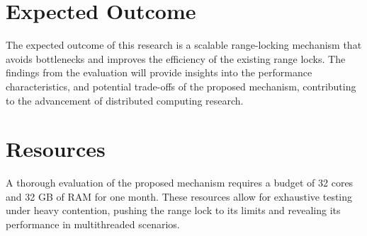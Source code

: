 \section{Expected Outcome}
The expected outcome of this research is a scalable range-locking mechanism that avoids bottlenecks and improves the efficiency of the existing range locks. The findings from the evaluation will provide insights into the performance characteristics, and potential trade-offs of the proposed mechanism, contributing to the advancement of distributed computing research.

\section{Resources}
A thorough evaluation of the proposed mechanism requires a budget of 32 cores and 32 GB of RAM for one month. These resources allow for exhaustive testing under heavy contention, pushing the range lock to its limits and revealing its performance in multithreaded scenarios.